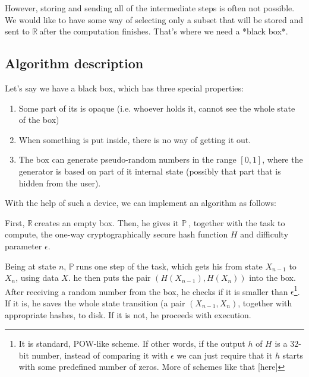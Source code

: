 \documentclass{winnower}
\newcommand{\R}{$\mathbb{R\ }$}
\newcommand{\X}{$\mathbb{P\ }$}
\begin{document}
However, storing and sending all of the intermediate steps is often not possible. We would like to have some way of selecting only a subset that will be stored and sent to \R after the computation finishes. That's where we need a *black box*.

\subsection{Algorithm description}

Let's say we have a black box, which has three special properties:
\begin{enumerate}
\item Some part of its is opaque (i.e. whoever holds it, cannot see the whole state of the box)
\item When something is put inside, there is no way of getting it out.
\item The box can generate pseudo-random numbers in the range $[0, 1]$, where the generator is based on part of it internal state (possibly that part that is hidden from the user). 
\end{enumerate}

With the help of such a device, we can implement an algorithm as follows:

First, \R creates an empty box. Then, he gives it \X, together with the task to compute, the one-way cryptographically secure hash function $H$ and difficulty parameter $\epsilon$.

Being at state $n$, \X runs one step of the task, which gets his from state $X_{n-1}$ to $X_n$, using data $X$. he then puts the pair $(H(X_{n-1}), H(X_n))$ into the box. After receiving a random number from the box, he checks if it is smaller than $\epsilon$\footnote{It is standard, POW-like scheme. If other words, if the output $h$ of $H$ is a $32$-bit number, instead of comparing it with $\epsilon$ we can just require that it $h$ starts with some predefined number of zeros. More of schemes like that [here]}. If it is, he saves the whole state transition (a pair $(X_{n-1}, X_n)$, together with appropriate hashes, to disk. If it is not, he proceeds with execution.
\end{document}
